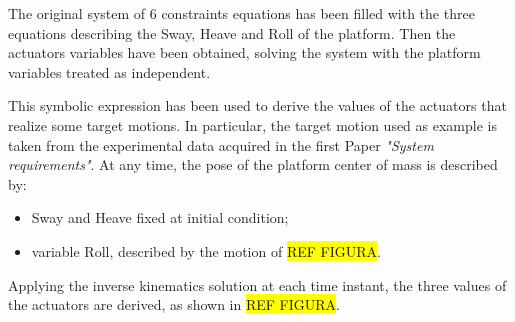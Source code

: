 \documentclass[10.5pt, twocolumn]{article}
\begin{document}
{The original system of 6 constraints equations has been filled with the three equations describing the Sway, Heave and Roll of the platform. Then the actuators variables have been obtained, solving the system with the platform variables treated as independent.

This symbolic expression has been used to derive the values of the actuators that realize some target motions. In particular, the target motion used as example is taken from the experimental data acquired in the first Paper \textit{"System requirements"}. At any time, the pose of the platform center of mass is described by:
\begin{itemize}
  \item Sway and Heave fixed at initial condition;
  \item variable Roll, described by the motion of \colorbox{yellow}{REF FIGURA}.
\end{itemize}

Applying the inverse kinematics solution at each time instant, the three values of the actuators are derived, as shown in \colorbox{yellow}{REF FIGURA}.

}
\end{document}
